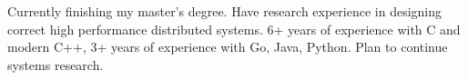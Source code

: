 

\begin{cvparagraph}

Currently finishing my master's degree. Have research experience in designing correct high performance distributed systems. 6+ years of experience with C and modern C++, 3+ years of experience with Go, Java, Python. Plan to continue systems research.
\end{cvparagraph}
